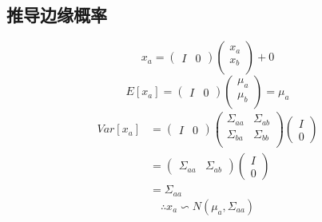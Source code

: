 \documentclass{report}
\begin{document}
\subsection{推导边缘概率}
$$
x_a = \left (\begin{matrix}I & 0\end{matrix}\right )\left (\begin{matrix}x_a \\x_b\\\end{matrix}\right ) + 0
$$
$$
E[x_a] = \left (\begin{matrix}I & 0\end{matrix}\right )\left (\begin{matrix}\mu_a \\\mu_b \\\end{matrix}\right ) = \mu_a
$$
$$
\begin{aligned}Var[x_a] &= \left (\begin{matrix}I & 0\end{matrix}\right )\left (\begin{matrix}\Sigma_{aa} & \Sigma_{ab} \\\Sigma_{ba} & \Sigma_{bb} \\\end{matrix}\right )\left (\begin{matrix}I \\0\end{matrix}\right ) \\&= \left (\begin{matrix}\Sigma_{aa} & \Sigma_{ab} \end{matrix}\right )\left (\begin{matrix}I \\0\end{matrix}\right )\\&=\Sigma_{aa}\end{aligned}
$$
$$
\therefore x_a \backsim N(\mu_a, \Sigma_{aa})
$$
\end{document}

